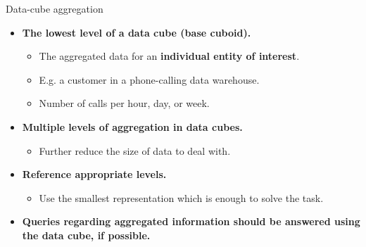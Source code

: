 \documentclass[aspectratio=169,t]{beamer}
\begin{document}
  { 
    \begin{frame}{Data-cube aggregation}
        \begin{itemize}
            \item \textbf{The lowest level of a data cube (base cuboid).}
            \begin{itemize}
              \item The aggregated data for an \textbf{individual entity of interest}.
              \item E.g. a customer in a phone-calling data warehouse.
              \item Number of calls per hour, day, or week.
            \end{itemize}
            \item \textbf{Multiple levels of aggregation in data cubes.}
            \begin{itemize}
              \item Further reduce the size of data to deal with.
            \end{itemize}
            \item \textbf{Reference appropriate levels.}
            \begin{itemize}
              \item Use the smallest representation which is enough to solve the task.
            \end{itemize}
            \item \textbf{Queries regarding aggregated information should be answered using the data cube, if possible.}
        \end{itemize}
    \end{frame}
  }
\end{document}
